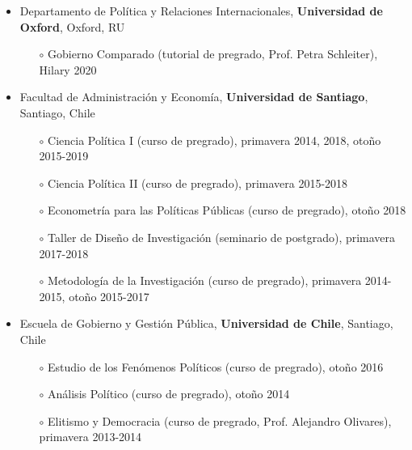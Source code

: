 \begin{publications}

\begin{itemize}
\item{\small Departamento de Política y Relaciones Internacionales, {\bfseries Universidad de Oxford}, Oxford, RU}
\begin{itemize}
\item[$\circ$]{\small Gobierno Comparado (tutorial de pregrado, Prof. Petra Schleiter), Hilary 2020}
\end{itemize}
\item{\small Facultad de Administración y Economía, {\bfseries Universidad de Santiago}, Santiago, Chile}
\begin{itemize}
\item[$\circ$]{\small Ciencia Política I (curso de pregrado), primavera 2014, 2018, otoño 2015-2019}
\item[$\circ$]{\small Ciencia Política II (curso de pregrado), primavera 2015-2018}
\item[$\circ$]{\small Econometría para las Políticas Públicas (curso de pregrado), otoño 2018}
\item[$\circ$]{\small Taller de Diseño de Investigación (seminario de postgrado), primavera 2017-2018}
\item[$\circ$]{\small Metodología de la Investigación (curso de pregrado), primavera 2014-2015, otoño 2015-2017}
\end{itemize}
\item{\small Escuela de Gobierno y Gestión Pública, {\bfseries Universidad de Chile}, Santiago, Chile}
\begin{itemize}
\item[$\circ$]{\small Estudio de los Fenómenos Políticos (curso de pregrado), otoño 2016}
\item[$\circ$]{\small Análisis Político (curso de pregrado), otoño 2014}
\item[$\circ$]{\small Elitismo y Democracia (curso de pregrado, Prof. Alejandro Olivares), primavera 2013-2014}
\end{itemize}
\end{itemize}

\vspace{1mm}
\end{publications}

